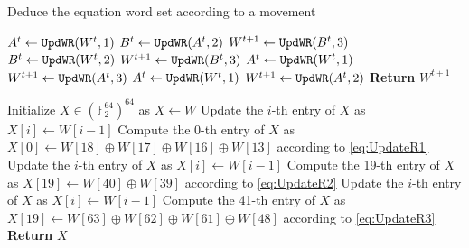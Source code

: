 \begin{algorithm}[htbp]
	\caption{Deduce the equation word set according to a movement} \label{alg:updateW}
	\begin{algorithmic}[1]
\State $A^t\leftarrow {\tt{UpdWR}}(W^t,1)$
\State $B^t\leftarrow {\tt{UpdWR}}(A^t,2)$
\State $W^{t+1}\leftarrow {\tt{UpdWR}}(B^t,3)$
\EndIf
{}
\State $B^t\leftarrow {\tt{UpdWR}}(W^t,2)$
\State $W^{t+1}\leftarrow {\tt{UpdWR}}(B^t,3)$
\EndIf
{}
\State $A^t\leftarrow {\tt{UpdWR}}(W^t,1)$
\State $W^{t+1}\leftarrow {\tt{UpdWR}}(A^t,3)$
\EndIf
{}
\State $A^t\leftarrow {\tt{UpdWR}}(W^t,1)$
\State $W^{t+1}\leftarrow {\tt{UpdWR}}(A^t,2)$
\EndIf
\State \textbf{Return } $W^{t+1}$
		\EndProcedure
	\end{algorithmic}
\begin{algorithmic}[1]
\State Initialize $X\in (\mathbb{F}_2^{64})^{64}$ as $X\leftarrow W$
\State Update the $i$-th entry of $X$ as $X[i]\leftarrow W[i-1]$
\EndFor
\State Compute the 0-th entry of $X$ as $X[0]\leftarrow W[18]\oplus W[17]\oplus W[16]\oplus W[13]$ according to \eqref{eq:UpdateR1}
\EndIf
{}
\State Update the $i$-th entry of $X$ as $X[i]\leftarrow W[i-1]$
\EndFor
\State Compute the 19-th entry of $X$ as $X[19]\leftarrow W[40]\oplus W[39]$ according to \eqref{eq:UpdateR2}
\EndIf
{}
\State Update the $i$-th entry of $X$ as $X[i]\leftarrow W[i-1]$
\EndFor
\State Compute the 41-th entry of $X$ as $X[19]\leftarrow W[63]\oplus W[62]\oplus W[61]\oplus W[48]$ according to \eqref{eq:UpdateR3}
\EndIf
\State \textbf{Return } $X$
		\EndProcedure
	\end{algorithmic}
\end{algorithm}

